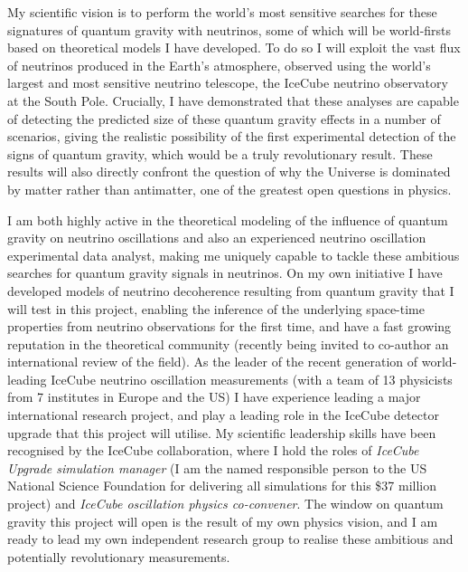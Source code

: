 \documentclass[a4paper,11pt]{article}
\begin{document}
My scientific vision is to perform the world's most sensitive searches for these signatures of quantum gravity with neutrinos, some of which will be world-firsts based on theoretical models I have developed. To do so I will exploit the vast flux of neutrinos produced in the Earth's atmosphere, observed using the world's largest and most sensitive neutrino telescope, the IceCube neutrino observatory at the South Pole. Crucially, I have demonstrated that these analyses are capable of detecting the predicted size of these quantum gravity effects in a number of scenarios, giving the realistic possibility of the first experimental detection of the signs of quantum gravity, which would be a truly revolutionary result. These results will also directly confront the question of why the Universe is dominated by matter rather than antimatter, one of the greatest open questions in physics.

I am both highly active in the theoretical modeling of the influence of quantum gravity on neutrino oscillations and also an experienced neutrino oscillation experimental data analyst, making me uniquely capable to tackle these ambitious searches for quantum gravity signals in neutrinos. On my own initiative I have developed models of neutrino decoherence resulting from quantum gravity that I will test in this project, enabling the inference of the underlying space-time properties from neutrino observations for the first time, and have a fast growing reputation in the theoretical community (recently being invited to co-author an international review of the field). As the leader of the recent generation of world-leading IceCube neutrino oscillation measurements (with a team of 13 physicists from 7 institutes in Europe and the US) I have experience leading a major international research project, and play a leading role in the IceCube detector upgrade that this project will utilise. My scientific leadership skills have been recognised by the IceCube collaboration, where I hold the roles of \textit{IceCube Upgrade simulation manager} (I am the named responsible person to the US National Science Foundation for delivering all simulations for this \$37 million project) and \textit{IceCube oscillation physics co-convener}. The window on quantum gravity this project will open is the result of my own physics vision, and I am ready to lead my own independent research group to realise these ambitious and potentially revolutionary measurements.

\end{document}
